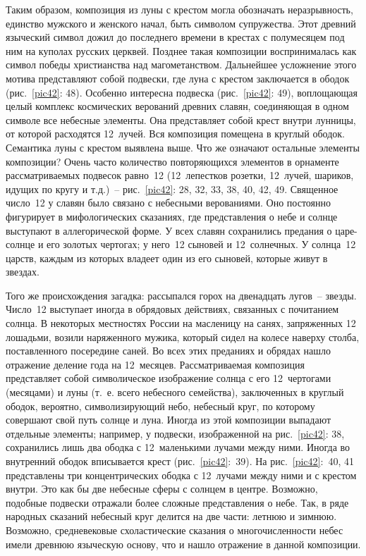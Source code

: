 \documentclass[pscyr,chapters]{hedwork}
\begin{document}
  Таким образом, композиция из луны с крестом могла обозначать неразрывность,
  единство мужского и женского начал, быть символом супружества. Этот древний
  языческий символ дожил до последнего времени в крестах
  с полумесяцем под ним на куполах русских церквей. Позднее такая композиции
  воспринималась как символ победы христианства над магометанством. Дальнейшее
  усложнение этого мотива представляют собой подвески, где луна с крестом
  заключается в ободок (рис.~\ref{pic42}: 48). Особенно интересна подвеска
  (рис.~\ref{pic42}: 49), воплощающая целый комплекс космических верований
  древних славян, соединяющая в одном символе все небесные элементы. Она
  представляет собой крест внутри лунницы, от которой расходятся 12~лучей. Вся
  композиция помещена в круглый ободок. Семантика луны с крестом выявлена выше.
  Что же означают остальные элементы композиции? Очень часто количество
  повторяющихся элементов в орнаменте рассматриваемых подвесок равно~12
  (12~лепестков розетки, 12~лучей, шариков, идущих по кругу и т.д.)~--
  рис.~\ref{pic42}: 28, 32, 33, 38, 40, 42, 49. Священное число~12 у славян было
  связано с небесными верованиями. Оно постоянно фигурирует в мифологических
  сказаниях, где представления о небе и солнце выступают в аллегорической форме.
  У всех славян сохранились предания о царе-солнце и его золотых чертогах; у
  него~12 сыновей и 12~солнечных. У солнца~12 царств, каждым из которых владеет
  один из его сыновей, которые живут в звездах.

  Того же происхождения загадка: рассыпался горох на двенадцать лугов~-- звезды.
  Число~12 выступает иногда в обрядовых действиях, связанных с почитанием
  солнца. В некоторых местностях
  России на масленицу на санях, запряженных 12 лошадьми, возили наряженного
  мужика, который сидел на колесе наверху столба, поставленного посередине
  саней. Во всех этих преданиях и обрядах нашло отражение деление года на
  12~месяцев. Рассматриваемая композиция представляет собой символическое
  изображение солнца с его 12~чертогами (месяцами) и луны (т.~е. всего небесного
  семейства), заключенных в круглый ободок, вероятно, символизирующий небо,
  небесный круг, по которому совершают свой путь солнце и луна. Иногда из этой
  композиции выпадают отдельные элементы; например, у подвески, изображенной на
  рис.~\ref{pic42}: 38, сохранились лишь два ободка с 12~маленькими лучами между
  ними. Иногда во внутренний ободок вписывается крест (рис.~\ref{pic42}:~39).
  На рис.~\ref{pic42}:~40, 41 представлены три концентрических ободка с
  12~лучами между ними и с крестом внутри. Это как бы две небесные сферы с
  солнцем в центре. Возможно, подобные подвески отражали более сложные
  представления о небе. Так, в ряде народных сказаний небесный круг делится на
  две части: летнюю и зимнюю. Возможно, средневековые схоластические сказания о
  многочисленности небес имели древнюю языческую основу, что и нашло отражение в
  данной композиции.
\end{document}

